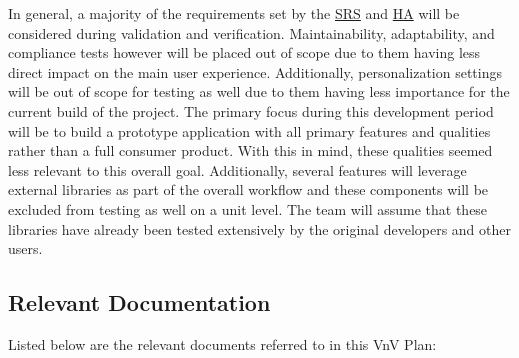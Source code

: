 \documentclass[12pt, titlepage]{article}
\begin{document}
In general, a majority of the requirements set by the
\href{https://github.com/r-yeh/grocery-spending-tracker/blob/master/docs/SRS/SRS.pdf}{SRS} and
\href{https://github.com/r-yeh/grocery-spending-tracker/blob/master/docs/HazardAnalysis/HazardAnalysis.pdf}{HA} will be considered
during validation and verification. Maintainability, adaptability, and compliance tests however will be placed out of scope
due to them having less direct impact on the main user experience. Additionally, personalization settings
will be out of scope for testing as well due to them having less importance for the current build of the project. The primary focus during
this development period will be to build a prototype application with all primary features and qualities rather than a
full consumer product. With this in mind, these qualities seemed less relevant to this overall goal.
Additionally, several features will leverage external libraries as part of the overall workflow and these components will
be excluded from testing as well on a unit level. The team will assume that these libraries have already
been tested extensively by the original developers and other users.

\subsection{Relevant Documentation}


Listed below are the relevant documents referred to in this VnV Plan:
\end{document}
